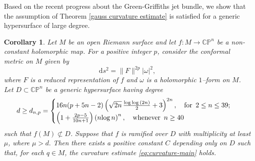 \documentclass[english, 12pt]{amsart}
\def\log{\mathrm{log}\,}
\theoremstyle{plain}
\newtheorem{cor}[thm]{{Corollary}}
\theoremstyle{remark}
\numberwithin{equation}{section}
\theoremstyle{plain}
\theoremstyle{named}
\begin{document}
Based on the recent progress about the Green-Griffiths jet bundle, we show that the assumption of Theorem \ref{gauss curvature estimate} is satisfied for a generic hypersurface of large degree.

\begin{cor}
	\label{cor of gauss curvature estimate}
	Let $M$ be an open Riemann surface and let $f\colon M\rightarrow\mathbb{CP}^n$ be a non-constant holomorphic map. For a positive integer $p$, consider the conformal metric on $M$ given by
	\[
	\mathrm{d}s^2=\|F\|^{2p}|\omega|^2,
	\]
	where $F$ is a reduced representation of $f$ and $\omega$ is a holomorphic $1$--form on $M$. 	Let $D\subset\mathbb{CP}^n$ be a generic hypersurface having degree
	\begin{equation*}
		d\geq d_{n,p}=
		\begin{cases}
			16n(p + 5n -2)\left(\sqrt{2n}\, \frac{\log\log(2n)}{2}+3\right)^{2n},\quad \text{for }\,2\leq n\leq 39;\\
			\left(1+\frac{2p-5}{10n+1}\right)\left(n\log n\right)^n,\quad \text{whenever\, $n\geq 40$}
		\end{cases}
	\end{equation*}
	such that $f(M)\not\subset D$. 
	Suppose that $f$ is ramified over $D$ with multiplicity at least $\mu$, where ${\mu}>{d}.$ 
	Then there exists a positive constant $C$ depending only on $D$ such that, for each $q\in M$, the curvature estimate \eqref{eq:curvature-main} holds.
\end{cor}
\end{document}
